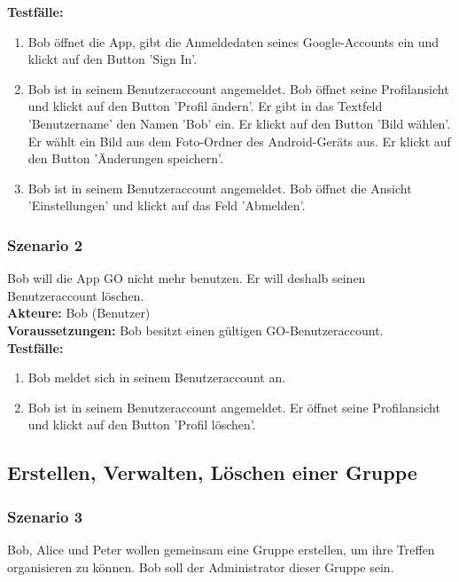 \documentclass[parskip=full]{scrartcl}
\def\threedigits#1{%
  \ifnum#1<100 0\fi
  \ifnum#1<10 0\fi
  \number#1}
\begin{document}
\textbf{Testfälle:}
\begin{enumerate}[label={\textbf{/T\protect\threedigits{\theenumi}0/}}, leftmargin=*]
	\item\label{Registrieren-Test} Bob öffnet die App, gibt die Anmeldedaten seines Google-Accounts ein und klickt auf den Button 'Sign In'.
	\item Bob ist in seinem Benutzeraccount angemeldet. Bob öffnet seine Profilansicht und klickt auf den Button 'Profil ändern'. Er gibt in das Textfeld 'Benutzername' den Namen 'Bob' ein. Er klickt auf den Button 'Bild wählen'. Er wählt ein Bild aus dem Foto-Ordner des Android-Geräts aus. Er klickt auf den Button 'Änderungen speichern'.
	\item Bob ist in seinem Benutzeraccount angemeldet. Bob öffnet die Ansicht 'Einstellungen' und klickt auf das Feld 'Abmelden'.
\end{enumerate}

\subsubsection*{Szenario 2}Bob will die App GO nicht mehr benutzen. Er will deshalb seinen Benutzeraccount löschen. \\

\textbf{Akteure:} Bob (Benutzer) \\

\textbf{Voraussetzungen: }Bob besitzt einen gültigen GO-Benutzeraccount.\\

\textbf{Testfälle:}
\begin{enumerate}[label={\textbf{/T\protect\threedigits{\theenumi}0/}}, leftmargin=*, resume]
	\item Bob meldet sich in seinem Benutzeraccount an. 
	\item Bob ist in seinem Benutzeraccount angemeldet. Er öffnet seine Profilansicht und klickt auf den Button 'Profil löschen'.
\end{enumerate}

\subsection{Erstellen, Verwalten, Löschen einer Gruppe}

\subsubsection*{Szenario 3} Bob, Alice und Peter wollen gemeinsam eine Gruppe erstellen, um ihre Treffen organisieren zu können. Bob soll der Administrator dieser Gruppe sein.\\
\end{document}
